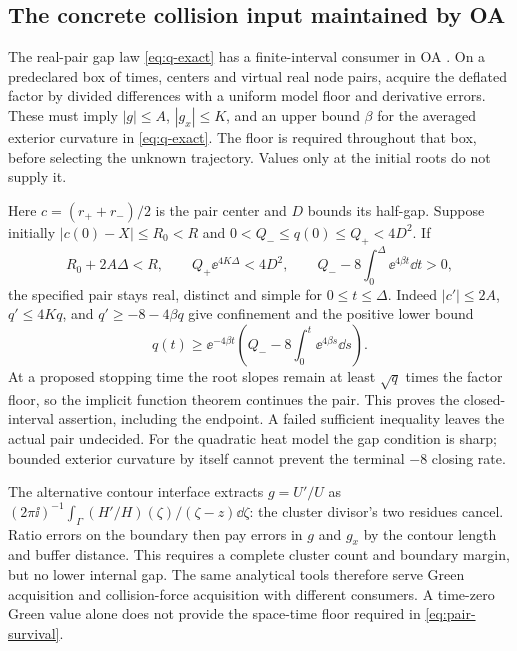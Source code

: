 \subsection{The concrete collision input maintained by OA}
The real-pair gap law \eqref{eq:q-exact} has a finite-interval consumer
in OA \cite[Section 4]{GNPCollisions}. On a predeclared box of times,
centers and virtual real node pairs, acquire the deflated factor by
divided differences with a uniform model floor and derivative errors.
These must imply \(|g|\le A\), \(|g_x|\le K\), and an upper bound
\(\beta\) for the averaged exterior curvature in \eqref{eq:q-exact}.
The floor is required throughout that box, before selecting the unknown
trajectory. Values only at the initial roots do not supply it.

Here \(c=(r_++r_-)/2\) is the pair center and \(D\) bounds its half-gap.
Suppose initially \(|c(0)-X|\le R_0<R\) and
\(0<Q_-\le q(0)\le Q_+<4D^2\). If
\begin{equation}\label{eq:pair-survival}
 R_0+2A\Delta<R,\qquad Q_+\ee^{4K\Delta}<4D^2,\qquad
 Q_--8\int_0^\Delta\ee^{4\beta t}\dd t>0,
\end{equation}
the specified pair stays real, distinct and simple for
\(0\le t\le\Delta\). Indeed \(|c'|\le2A\), \(q'\le4Kq\), and
\(q'\ge-8-4\beta q\) give confinement and the positive lower bound
\[
 q(t)\ge\ee^{-4\beta t}
       \left(Q_--8\int_0^t\ee^{4\beta s}\dd s\right).
\]
At a proposed stopping time the root slopes remain at least
\(\sqrt q\) times the factor floor, so the implicit function theorem
continues the pair. This proves the closed-interval assertion, including
the endpoint. A failed sufficient inequality leaves the actual pair
undecided. For the quadratic heat model the gap condition is sharp;
bounded exterior curvature by itself cannot prevent the terminal
\(-8\) closing rate.

The alternative contour interface extracts \(g=U'/U\) as
\((2\pi\ii)^{-1}\int_\Gamma(H'/H)(\zeta)/(\zeta-z)\dd\zeta\): the
cluster divisor's two residues cancel. Ratio errors on the boundary
then pay errors in \(g\) and \(g_x\) by the contour length and buffer
distance. This requires a complete cluster count and boundary margin,
but no lower internal gap. The same analytical tools therefore serve
Green acquisition and collision-force acquisition with different
consumers. A time-zero Green value alone does not provide the
space-time floor required in \eqref{eq:pair-survival}.
